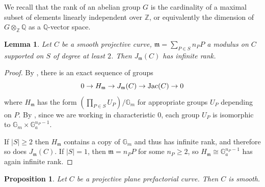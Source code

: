 \documentclass{amsart}
\newcommand{\Z}{\mathbb Z}
\newcommand{\Q}{\mathbb Q}
\theoremstyle{plain}
\newtheorem{prop}[thm]{Proposition}
\newtheorem{lem}[thm]{Lemma}
\theoremstyle{definition}
\newcommand{\Jac}{\textnormal{Jac}}
\begin{document}
We recall that the rank of an abelian group $G$ is the cardinality of a maximal subset of elements linearly independent over $\Z$, or equivalently the dimension of $G\otimes_\Z \Q$ as a $\Q$-vector space. 

\begin{lem}\label{fac:infinite rank gen jac}
	Let $C$ be a smooth projective curve, $\mathfrak{m}=\sum_{P \in S} n_P P$ a modulus on $C$ supported on $S$ of degree at least $2$. Then $J_{\mathfrak{m}}(C)$ has infinite rank.
\end{lem}

\begin{proof}
	By \cite[Ch.~V.13, Proposition 7, p. 92]{Serre}, there is an exact sequence of groups \[0 \rightarrow H_{\mathfrak{m}} \rightarrow J_{\mathfrak{m}}(C) \rightarrow \Jac(C) \rightarrow 0 \] where $H_{\mathfrak{m}}$ has the form $\left(\prod_{P \in S} U_P\right)/\mathbb{G}_m$ for appropriate groups $U_P$ depending on $P$. By \cite[Ch.~V.15, Corollary on p.94]{Serre}, since we are working in characteristic $0$, each group $U_P$ is isomorphic to $\mathbb{G}_m \times \mathbb{G}_a^{n_P-1}$. 
	
	If $|S| \geq 2$ then $H_{\mathfrak{m}}$ contains a copy of $\mathbb{G}_m$ and thus has infinite rank, and therefore so does $J_{\mathfrak{m}}(C)$. If $|S|=1$, then $\mathfrak{m}=n_P P$ for some $n_P \geq 2$, so $H_{\mathfrak{m}} \cong \mathbb{G}_a^{n_P-1}$ has again infinite rank.
\end{proof}


\begin{prop}\label{prop:if-pref-then-smooth}
	Let $C$ be a projective plane prefactorial curve. Then $C$ is smooth.
\end{prop} 
\end{document}
